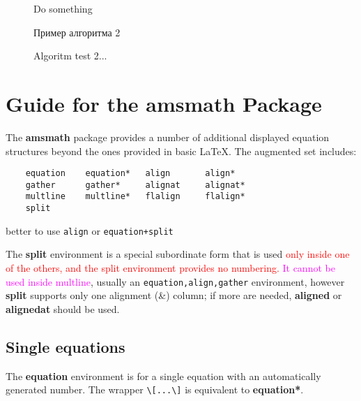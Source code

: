 \begin{figure} %
	\begin{algorithm}[H]%
		\SetAlgoLined
		
		\KwOutput{$\emptyset$}
		
		{
			Do something \;
		}
		\caption{Пример алгоритма 2}	\label{algo_disjdecomp2}
	\end{algorithm}
	\caption{Algoritm test 2...}
\end{figure}

\section{Guide for the amsmath Package}
The \textbf{amsmath} package provides a number of additional displayed equation structures beyond the ones provided in basic \LaTeX. The augmented set includes:
\begin{verbatim}
	equation 	equation* 	align 		align*
	gather 		gather* 	alignat 	alignat*
	multline 	multline* 	flalign 	flalign*
	split
\end{verbatim}

better to use \verb*|align| or \verb*|equation+split|

The \textbf{split} environment is a special subordinate form that is used \textcolor{red}{only inside one of the others, and the split environment provides no numbering.} \textcolor{magenta}{It cannot be used inside multline},  usually an \verb*|equation,align,gather| environment, however \textbf{split} supports only one alignment (\&) column; if more are needed, \textbf{aligned} or \textbf{alignedat} should be used. 

\subsection{Single equations}
The \textbf{equation} environment is for a single equation with an automatically generated number. 
The wrapper \verb*|\[...\]| is equivalent to \textbf{equation*}.

